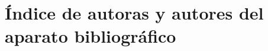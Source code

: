 
\chapter[\hspace{1.5pc}Índice de autoras y autores del aparato bibliográfico]{Índice de autoras y autores del aparato bibliográfico}

\begingroup
\let\clearpage\relax %
\raggedright
{\small
	\printindex[names]
}
\endgroup


\justifying
